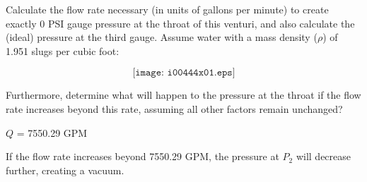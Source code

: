 

Calculate the flow rate necessary (in units of gallons per minute) to create exactly 0 PSI gauge pressure at the throat of this venturi, and also calculate the (ideal) pressure at the third gauge.  Assume water with a mass density ($\rho$) of 1.951 slugs per cubic foot:

$$\texttt{[image: i00444x01.eps]}$$

Furthermore, determine what will happen to the pressure at the throat if the flow rate increases beyond this rate, assuming all other factors remain unchanged?







$Q$ = 7550.29 GPM

\vskip 10pt

If the flow rate increases beyond 7550.29 GPM, the pressure at $P_2$ will decrease further, creating a vacuum.











